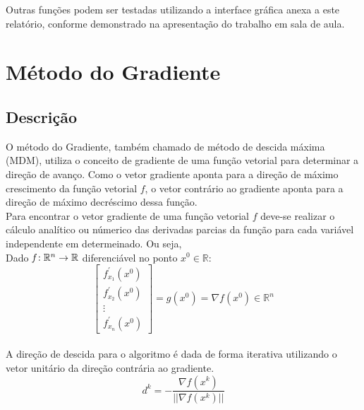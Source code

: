 \documentclass[a4paper,12pt,utf8x,notitlepage]{article}
\begin{document}
Outras funções podem ser testadas utilizando a interface gráfica anexa a este relatório, conforme demonstrado na apresentação do trabalho em sala de aula.\\

\section{Método do Gradiente}


\subsection{Descrição}

O método do Gradiente, também chamado de método de descida máxima (MDM), utiliza o conceito de gradiente de uma função vetorial para determinar a direção de avanço. Como o vetor gradiente aponta para a direção de máximo crescimento da função vetorial $f$, o vetor contrário ao gradiente aponta para a direção de máximo decréscimo dessa função.\\

Para encontrar o vetor gradiente de uma função vetorial $f$ deve-se realizar o cálculo analítico ou númerico das derivadas parcias da função para cada variável independente em determeinado. Ou seja,\\

Dado $\emph{f}:  \mathbb{R}^n \rightarrow  \mathbb{R}$ diferenciável no ponto $x^{0} \in \mathbb{R}$:\\

\begin{equation}
\begin{bmatrix}
f_{x_1}^\prime(x^0)\\
f_{x_2}^\prime(x^0)\\
\vdots\\
f_{x_n}^\prime(x^0)
\end{bmatrix} = g(x^0)=\nabla f(x^0) \in \mathbb{R}^n 
\end{equation}\\

A direção de descida para o algoritmo é dada de forma iterativa utilizando o vetor unitário da direção contrária ao gradiente.\\

\begin{equation}
d^k = -\frac{\nabla f(x^k)}{||\nabla f(x^k)||}
\end{equation}\\
\end{document}
